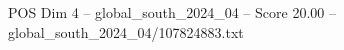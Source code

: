 \begin{textsample}{POS Dim 4 – global\_south\_2024\_04 – Score 20.00 – global\_south\_2024\_04/107824883.txt}
\end{textsample}
